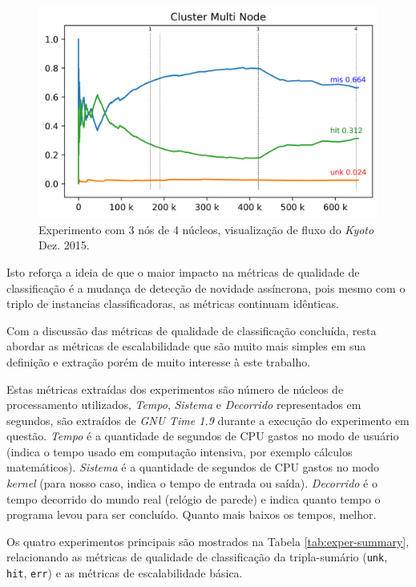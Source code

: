 \begin{figure}[htb]
  \centering
  \includegraphics[width=0.75\linewidth]{experiments/tmi-n12-log.png}
  \caption{Experimento \mfog \multi com 3 nós de 4 núcleos, visualização de fluxo do \dataset \emph{Kyoto} Dez. 2015.}
  \label{fig:multi-flow}
\end{figure}

Isto reforça a ideia de que o maior impacto na métricas de qualidade de
classificação é a mudança de detecção de novidade assíncrona, pois mesmo com o
triplo de instancias classificadoras, as métricas continuam idênticas.

Com a discussão das métricas de qualidade de classificação concluída, resta
abordar as métricas de escalabilidade que são muito mais simples em sua
definição e extração porém de muito interesse à este trabalho.

Estas métricas extraídas dos experimentos são número de núcleos de processamento
utilizados, \emph{Tempo}, \emph{Sistema} e \emph{Decorrido} representados em
segundos, são extraídos de \emph{GNU Time 1.9} durante a execução do experimento
em questão.
\emph{Tempo} é a quantidade de segundos de CPU gastos no modo de usuário
(indica o tempo usado em computação intensiva, por exemplo cálculos matemáticos).
\emph{Sistema} é a quantidade de segundos de CPU gastos no modo \emph{kernel} (para
nosso caso, indica o tempo de entrada ou saída).
\emph{Decorrido} é o tempo decorrido do mundo real (relógio de parede) e indica
quanto tempo o programa levou para ser concluído.
Quanto mais baixos os tempos, melhor.

Os quatro experimentos principais são mostrados na Tabela
\ref{tab:exper-summary}, relacionando as métricas de qualidade de classificação
da tripla-sumário (\texttt{unk}, \texttt{hit}, \texttt{err}) e as métricas de
escalabilidade básica.

\newcommand{\mr}[1]{\multirow{2}{*}{\texttt{#1}}}

